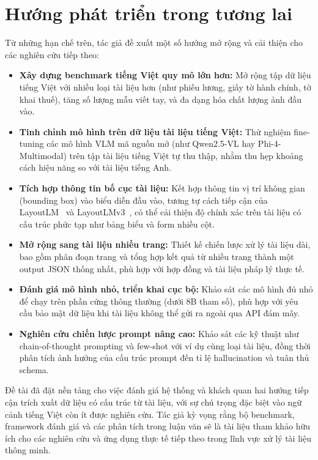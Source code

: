 ﻿\documentclass[12pt]{report}
\begin{document}
\section{Hướng phát triển trong tương lai}\label{sec:future_work}

Từ những hạn chế trên, tác giả đề xuất một số hướng mở rộng và cải thiện cho các nghiên cứu tiếp theo:

\begin{itemize}
    \item \textbf{Xây dựng benchmark tiếng Việt quy mô lớn hơn:} Mở rộng tập dữ liệu tiếng Việt với nhiều loại tài liệu hơn (như phiếu lương, giấy tờ hành chính, tờ khai thuế), tăng số lượng mẫu viết tay, và đa dạng hóa chất lượng ảnh đầu vào.

    \item \textbf{Tinh chỉnh mô hình trên dữ liệu tài liệu tiếng Việt:} Thử nghiệm fine-tuning các mô hình VLM mã nguồn mở (như Qwen2.5-VL hay Phi-4-Multimodal) trên tập tài liệu tiếng Việt tự thu thập, nhằm thu hẹp khoảng cách hiệu năng so với tài liệu tiếng Anh.

    \item \textbf{Tích hợp thông tin bố cục tài liệu:} Kết hợp thông tin vị trí không gian (bounding box) vào biểu diễn đầu vào, tương tự cách tiếp cận của LayoutLM~\cite{xu2020layoutlm} và LayoutLMv3~\cite{huang2022layoutlmv3}, có thể cải thiện độ chính xác trên tài liệu có cấu trúc phức tạp như bảng biểu và form nhiều cột.

    \item \textbf{Mở rộng sang tài liệu nhiều trang:} Thiết kế chiến lược xử lý tài liệu dài, bao gồm phân đoạn trang và tổng hợp kết quả từ nhiều trang thành một output JSON thống nhất, phù hợp với hợp đồng và tài liệu pháp lý thực tế.

    \item \textbf{Đánh giá mô hình nhỏ, triển khai cục bộ:} Khảo sát các mô hình đủ nhỏ để chạy trên phần cứng thông thường (dưới 8B tham số), phù hợp với yêu cầu bảo mật dữ liệu khi tài liệu không thể gửi ra ngoài qua API đám mây.

    \item \textbf{Nghiên cứu chiến lược prompt nâng cao:} Khảo sát các kỹ thuật như chain-of-thought prompting và few-shot với ví dụ cùng loại tài liệu, đồng thời phân tích ảnh hưởng của cấu trúc prompt đến tỉ lệ hallucination và tuân thủ schema.
\end{itemize}

Đề tài đã đặt nền tảng cho việc đánh giá hệ thống và khách quan hai hướng tiếp cận trích xuất dữ liệu có cấu trúc từ tài liệu, với sự chú trọng đặc biệt vào ngữ cảnh tiếng Việt còn ít được nghiên cứu. Tác giả kỳ vọng rằng bộ benchmark, framework đánh giá và các phân tích trong luận văn sẽ là tài liệu tham khảo hữu ích cho các nghiên cứu và ứng dụng thực tế tiếp theo trong lĩnh vực xử lý tài liệu thông minh.
\end{document}
